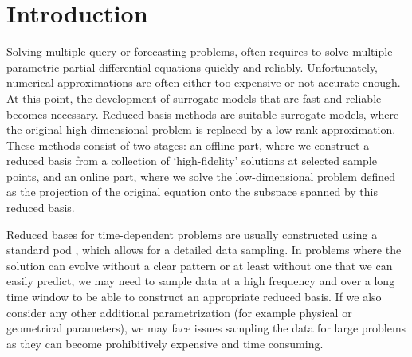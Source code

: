 \section{Introduction}

Solving multiple-query or forecasting problems, often requires to solve multiple parametric partial differential equations quickly and reliably. Unfortunately, numerical approximations are often either too expensive or not accurate enough. At this point, the development of surrogate models that are fast and reliable becomes necessary. Reduced basis methods are suitable surrogate models, where the original high-dimensional problem is replaced by a low-rank approximation. These methods consist of two stages: an offline part, where we construct a reduced basis from a collection of `high-fidelity' solutions at selected sample points, and an online part, where we solve the low-dimensional problem defined as the projection of the original equation onto the subspace spanned by this reduced basis.

Reduced bases for time-dependent problems are usually constructed using a standard \gls{pod} \cite{Hesthaven2022,schleus_randomized_2022,baurChapterComparisonMethods2017}, which allows for a detailed data sampling. In problems where the solution can evolve without a clear pattern or at least without one that we can easily predict, we may need to sample data at a high frequency and over a long time window to be able to construct an appropriate reduced basis. If we also consider any other additional parametrization (for example physical or geometrical parameters), we may face issues sampling the data for large problems as they can become prohibitively expensive and time consuming. 

